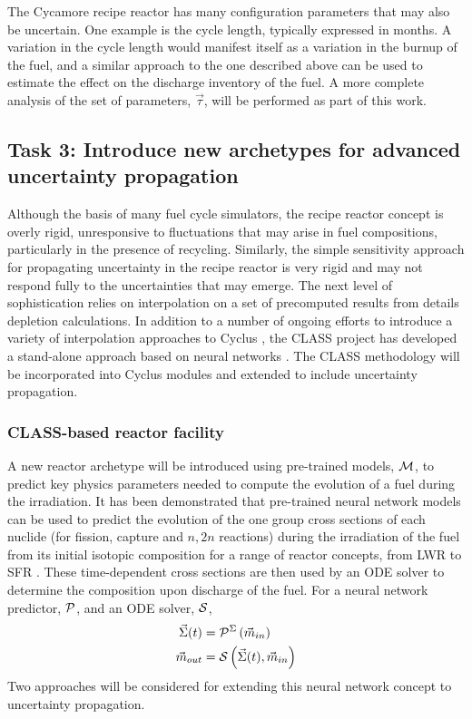 \documentclass[dvips,12pt]{article}
\begin{document}
The Cycamore recipe reactor has many configuration
parameters that may also be uncertain.  One
example is the cycle length, typically expressed
in months.  A variation in the cycle length would
manifest itself as a variation in the burnup of
the fuel, and a similar approach to the one
described above can be used to estimate the effect
on the discharge inventory of the fuel.  A more
complete analysis of the set of parameters,
$\vec{\tau}$, will be performed as part of this work.

\subsection{Task 3: Introduce new archetypes for advanced uncertainty propagation}

Although the basis of many fuel cycle simulators,
the recipe reactor concept is overly rigid,
unresponsive to fluctuations that may arise in fuel
compositions, particularly in the presence of
recycling.  Similarly, the simple sensitivity
approach for propagating uncertainty in the recipe
reactor is very rigid and may not respond fully to
the uncertainties that may emerge.  The next level
of sophistication relies on interpolation on a set
of precomputed results from details depletion
calculations.  In addition to a number of ongoing
efforts to introduce a variety of interpolation
approaches to Cyclus \cite{brightlite, cyborg}, the
CLASS project\cite{CLASS} has developed a
stand-alone approach based on neural networks \cite{Leniau.ANE.2015}. The
CLASS methodology will be incorporated into Cyclus
modules and extended to include uncertainty
propagation.

\subsubsection{CLASS-based reactor facility} \label{sec:reactors}

A new reactor archetype will be introduced using
pre-trained models, ${\cal M}$, to predict key
physics parameters needed to compute the evolution
of a fuel during the irradiation. It has been
demonstrated that pre-trained neural network
models can be used to predict the evolution of the
one group cross sections of each nuclide (for
fission, capture and $n,2n$ reactions) during the
irradiation of the fuel from its initial isotopic
composition for a range of reactor concepts, from
LWR to SFR \cite{Leniau.ANE.2015, Leniau.PHYSOR.2016}.
These time-dependent cross sections are then used
by an ODE solver to determine the composition upon
discharge of the fuel.  For a neural network
predictor, ${\cal P}$, and an ODE solver, ${\cal S}$,
\begin{align}
  \vec{\Sigma}(t) &= {\cal P}^{\Sigma}\left( \vec{m}_{in}\right)\\
  \vec{m}_{out} &= {\cal S}\left( \vec{\Sigma}(t), \vec{m}_{in}\right)
\end{align}
Two approaches will be considered for extending
this neural network concept to uncertainty
propagation.
\end{document}
